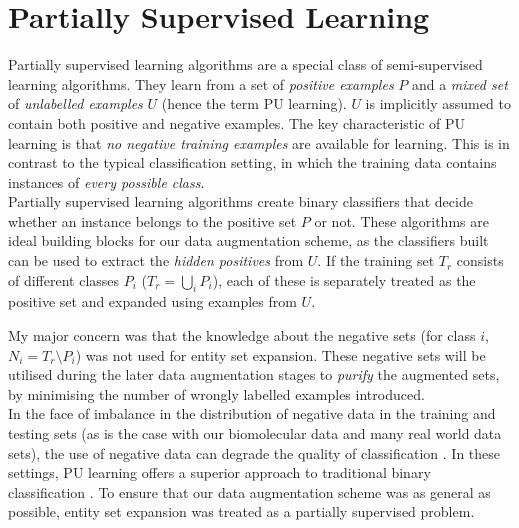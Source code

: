 \documentclass[12pt,twoside,notitlepage,amsart]{report} %
\begin{document}
	\section{Partially Supervised Learning} %
	
	Partially supervised learning algorithms are a special class of semi-supervised learning algorithms. They learn from a set of \emph{positive examples} $P$ and a \emph{mixed set} of \emph{unlabelled examples} $U$ (hence the term PU learning). $U$ is implicitly assumed to contain both positive and negative examples. The key characteristic of PU learning is that \emph{no negative training examples} are available for learning. This is in contrast to the typical classification setting, in which the training data contains instances of \emph{every possible class}. \\
	
	Partially supervised learning algorithms create binary classifiers that decide whether an instance belongs to the positive set $P$ or not. These algorithms are ideal building blocks for our data augmentation scheme, as the classifiers built can be used to extract the \emph{hidden positives} from $U$. If the training set $T_r$ consists of different classes $P_i$ ($T_r = \bigcup_{i}{P_i} $), each of these is separately treated as the positive set and expanded using examples from $U$. 
	
	My major concern was that the knowledge about the negative sets (for class $i$, $N_i = T_r \setminus P_i$) was not used for entity set expansion. These negative sets will be utilised during the later data augmentation stages to \emph{purify} the augmented sets, by minimising the number of wrongly labelled examples introduced. \\
	
In the face of imbalance in the distribution of negative data in the training and testing sets (as is the case with our biomolecular data and many real world data sets), the use of negative data can degrade the quality of classification \cite{Li210}. In these settings, PU learning offers a superior approach to traditional binary classification \cite{Li210}. To ensure that our data augmentation scheme was as general as possible, entity set expansion was treated as a partially supervised problem.  

	
	
\end{document}
